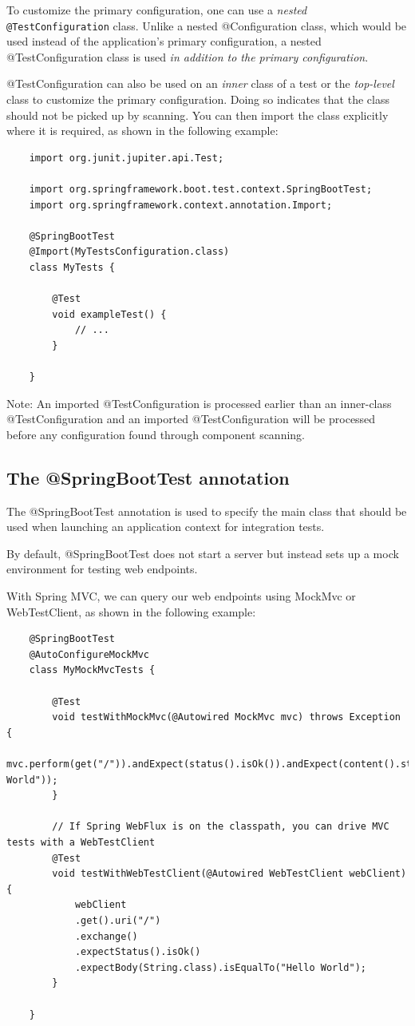 \documentclass{scrartcl}
\begin{document}
To customize the primary configuration, one can use a \textit{nested} \lstinline|@TestConfiguration| class. Unlike a nested @Configuration class, which would be used instead of the application’s primary configuration, a nested @TestConfiguration class is used \textit{in addition to the primary configuration}.

@TestConfiguration can also be used on an \textit{inner} class of a test or the \textit{top-level} class to customize the primary configuration. Doing so indicates that the class should not be picked up by scanning. You can then import the class explicitly where it is required, as shown in the following example:

\begin{lstlisting}
    import org.junit.jupiter.api.Test;

    import org.springframework.boot.test.context.SpringBootTest;
    import org.springframework.context.annotation.Import;

    @SpringBootTest
    @Import(MyTestsConfiguration.class)
    class MyTests {

        @Test
        void exampleTest() {
            // ...
        }

    }
\end{lstlisting}

Note: An imported @TestConfiguration is processed earlier than an inner-class @TestConfiguration and an imported @TestConfiguration will be processed before any configuration found through component scanning.

\subsection{The @SpringBootTest annotation}

The @SpringBootTest annotation is used to specify the main class that should be used when launching an application context for integration tests.

By default, @SpringBootTest does not start a server but instead sets up a mock environment for testing web endpoints.

With Spring MVC, we can query our web endpoints using MockMvc or WebTestClient, as shown in the following example:

\begin{lstlisting}
    @SpringBootTest
    @AutoConfigureMockMvc
    class MyMockMvcTests {

        @Test
        void testWithMockMvc(@Autowired MockMvc mvc) throws Exception {
            mvc.perform(get("/")).andExpect(status().isOk()).andExpect(content().string("Hello World"));
        }

        // If Spring WebFlux is on the classpath, you can drive MVC tests with a WebTestClient
        @Test
        void testWithWebTestClient(@Autowired WebTestClient webClient) {
            webClient
            .get().uri("/")
            .exchange()
            .expectStatus().isOk()
            .expectBody(String.class).isEqualTo("Hello World");
        }

    }

\end{lstlisting}
\end{document}
